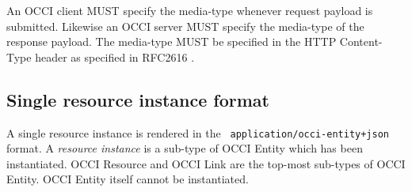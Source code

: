 \documentclass[10pt,a4paper]{article}
\begin{document}
An OCCI client MUST specify the media-type whenever request payload is
submitted. Likewise an OCCI server MUST specify the media-type of the response
payload. The media-type MUST be specified in the HTTP Content-Type header as specified
in RFC2616 \cite{rfc2616}.

\subsection{Single resource instance format}
\label{sec:format_entity}

A single resource instance is rendered in the {\tt
application/occi-entity+json} format.
A {\em resource instance} is a sub-type of OCCI Entity which has been instantiated.
OCCI Resource and OCCI Link are the top-most sub-types of OCCI Entity.
OCCI Entity itself cannot be instantiated.
\end{document}
